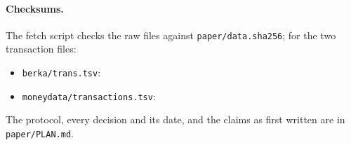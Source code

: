 \paragraph{Checksums.} The fetch script checks the raw files against
\texttt{paper/data.sha256}; for the two transaction files:
\begin{itemize}
\item \texttt{berka/trans.tsv}:\\
  \texttt{\scriptsize{}}
\item \texttt{moneydata/transactions.tsv}:\\
  \texttt{\scriptsize{}}
\end{itemize}
The protocol, every decision and its date, and the claims as first written
are in \texttt{paper/PLAN.md}.
